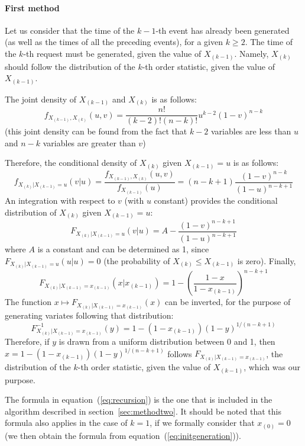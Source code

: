 \documentclass[12pt]{article} %
\begin{document}
\paragraph{First method}
Let us consider that the time of the $k-1$-th event has already been generated (as well as the times of all the preceding events), for a given $k \geq 2$. The time of the $k$-th request must be generated, given the value of $X_{(k-1)}$. Namely, $X_{(k)}$ should follow the distribution of the $k$-th order statistic, given the value of $X_{(k-1)}$.\par
The joint density of $X_{(k-1)}$ and $X_{(k)}$ is as follows:
\begin{equation}
f_{X_{(k-1)},X_{(k)}} (u,v) = \frac{n!}{(k-2)!(n-k)!}u^{k-2}(1-v)^{n-k}
\end{equation}
(this joint density can be found from the fact that $k-2$ variables are less than $u$ and $n-k$ variables are greater than $v$)\par
Therefore, the conditional density of $X_{(k)}$ given $X_{(k-1)}=u$ is as follows:
\begin{equation}
f_{X_{(k)}|X_{(k-1)}=u} (v|u) = \frac{f_{X_{(k-1)},X_{(k)}} (u,v)}{f_{X_{(k-1)}} (u)} = (n-k+1)\frac{(1-v)^{n-k}}{(1-u)^{n-k+1}}
\end{equation}
An integration with respect to $v$ (with $u$ constant) provides the conditional distribution of $X_{(k)}$ given $X_{(k-1)}=u$:
\begin{equation}
F_{X_{(k)}|X_{(k-1)}=u} (v|u) = A - \frac{(1-v)^{n-k+1}}{(1-u)^{n-k+1}}
\end{equation}
where $A$ is a constant and can be determined as 1, since $F_{X_{(k)}|X_{(k-1)}=u} (u|u) = 0$ (the probability of $X_{(k)}\leq X_{(k-1)}$ is zero). Finally,
\begin{equation}
F_{X_{(k)}|X_{(k-1)}=x_{(k-1)}} (x|x_{(k-1)}) = 1 - \left(\frac{1-x}{1-x_{(k-1)}}\right)^{n-k+1}
\end{equation}
The function $x\mapsto F_{X_{(k)}|X_{(k-1)}=x_{(k-1)}}(x)$ can be inverted, for the purpose of generating variates following that distribution:
\begin{equation}\label{eq:recursion}
F^{-1}_{X_{(k)}|X_{(k-1)}=x_{(k-1)}} (y) = 1- (1-x_{(k-1)})(1-y)^{1/(n-k+1)}
\end{equation}
Therefore, if $y$ is drawn from a uniform distribution between 0 and 1, then $x=1-(1-x_{(k-1)})(1-y)^{1/(n-k+1)}$ follows $F_{X_{(k)}|X_{(k-1)}=x_{(k-1)}}$, the distribution of the $k$-th order statistic, given the value of $X_{(k-1)}$, which was our purpose.\par
The formula in equation~(\ref{eq:recursion}) is the one that is included in the algorithm described in section~\ref{sec:methodtwo}. It should be noted that this formula also applies in the case of $k=1$, if we formally consider that $x_{(0)}=0$ (we then obtain the formula from equation~(\ref{eq:initgeneration})).
%
%
\end{document}
